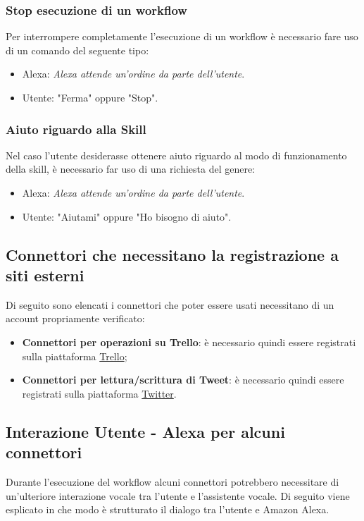 \subsubsection{Stop esecuzione di un workflow}
Per interrompere completamente l'esecuzione di un workflow è necessario fare uso di un comando del seguente tipo:
\begin{itemize}
	\item Alexa: \textit{Alexa attende un'ordine da parte dell'utente}.
	\item Utente: "Ferma" oppure "Stop".
\end{itemize}
\subsubsection{Aiuto riguardo alla Skill}
Nel caso l'utente desiderasse ottenere aiuto riguardo al modo di funzionamento della skill, è necessario far uso di una richiesta del genere:
\begin{itemize}
	\item Alexa: \textit{Alexa attende un'ordine da parte dell'utente}.
	\item Utente: "Aiutami" oppure "Ho bisogno di aiuto".
\end{itemize}

\subsection{Connettori che necessitano la registrazione a siti esterni}
Di seguito sono elencati i connettori che poter essere usati necessitano di un account propriamente verificato:
\begin{itemize}
	\item \textbf{Connettori per operazioni su Trello}: è necessario quindi essere registrati sulla piattaforma \href{https://trello.com}{Trello};
	\item \textbf{Connettori per lettura/scrittura di Tweet}: è necessario quindi essere registrati sulla piattaforma \href{https://twitter.com/}{Twitter}.
\end{itemize}


\subsection{Interazione Utente - Alexa per alcuni connettori}
Durante l’esecuzione del workflow alcuni connettori potrebbero necessitare di un’ulteriore
interazione vocale tra l’utente e l’assistente vocale. Di seguito viene esplicato in che modo
è strutturato il dialogo tra l’utente e Amazon Alexa.
